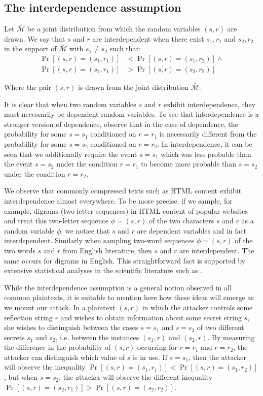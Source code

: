 \subsection{The interdependence assumption}\label{subsec:interdependence}

Let $\bar{\mathcal{M}}$ be a joint distribution from which the random variables
$(s, r)$ are drawn. We say that $s$ and $r$ are interdependent when there exist
$s_1, r_1$ and $s_2, r_2$ in the support of $\bar{\mathcal{M}}$ with $s_1 \neq
s_2$ such that:
\begin{align*}
    \Pr[(s, r) = (s_1, r_1)] &< \Pr[(s, r) = (s_1, r_2)]
\land\\
    \Pr[(s, r) = (s_2, r_1)] &> \Pr[(s, r) = (s_2, r_2)]
\end{align*}

Where the pair $(s, r)$ is drawn from the joint distribution
$\bar{\mathcal{M}}$.

It is clear that when two random variables $s$ and $r$ exhibit interdependence,
they must necessarily be dependent random variables. To see that
interdependence is a stronger version of dependence, observe that in the case
of dependence, the probability for some $s = s_1$ conditioned on $r = r_1$ is
necessarily different from the probability for some $s = s_2$ conditioned on $r
= r_2$. In interdependence, it can be seen that we additionally require the
event $s = s_1$ which was less probable than the event $s = s_2$ under the
condition $r = r_1$ to become more probable than $s = s_2$ under the condition
$r = r_2$.

We observe that commonly compressed texts such as HTML content exhibit
interdependence almost everywhere. To be more precise, if we sample, for
example, digrams (two-letter sequences) in HTML content of popular websites and
treat this two-letter sequence $\phi = (s, r)$ of the two characters $s$ and
$r$ as a random variable $\phi$, we notice that $s$ and $r$ are dependent
variables and in fact interdependent. Similarly when sampling two-word sequences
$\phi = (s, r)$ of the two words $s$ and $r$ from English literature, then $s$
and $r$ are interdependent. The same occurs for digrams in English. This
straightforward fact is supported by extensive statistical analyses in the
scientific literature such as \cite{mayzner1965tables}.

While the interdependence assumption is a general notion observed in all common
plaintexts, it is suitable to mention here how these ideas will emerge as we
mount our attack. In a plaintext $(s, r)$ in which the attacker controls some
reflection string $r$ and wishes to obtain information about some secret string
$s$, she wishes to distinguish between the cases $s = s_1$ and $s = s_2$ of two
different secrets $s_1$ and $s_2$, i.e. between the instances $(s_1, r)$ and
$(s_2, r)$. By measuring the difference in the probability of $(s, r)$
occurring for $r = r_1$ and $r = r_2$, the attacker can distinguish which value
of $s$ is in use. If $s = s_1$, then the attacker will observe the inequality
$\Pr[(s, r) = (s_1, r_1)] < \Pr[(s, r) = (s_1, r_2)]$, but when $s = s_2$, the
attacker will observe the different inequality $\Pr[(s, r) = (s_2, r_1)] >
\Pr[(s, r) = (s_2, r_2)]$.

